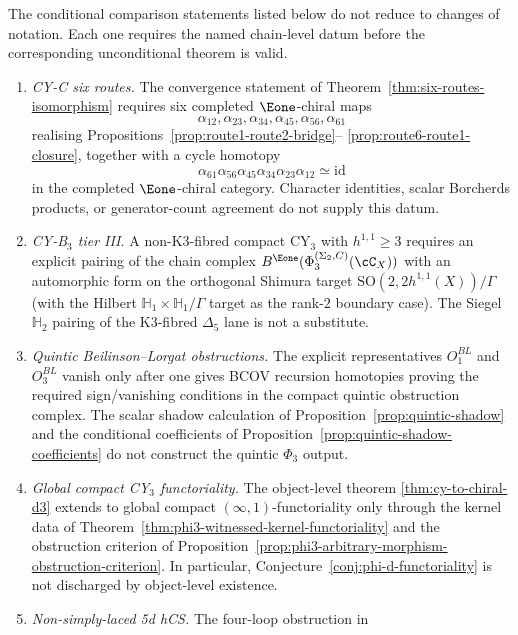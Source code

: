 \begin{theorem}
\label{thm:frontier-obstruction-normal-form}
The conditional comparison statements listed below do not reduce to
changes of notation. Each one requires the named chain-level datum
before the corresponding unconditional theorem is valid.
\begin{enumerate}[label=\textup{(F\arabic*)}]
 \item \emph{CY-C six routes.} The convergence statement of
 Theorem~\ref{thm:six-routes-isomorphism} requires six completed
 $\Eone$-chiral maps
 \[
 \alpha_{12},\alpha_{23},\alpha_{34},\alpha_{45},\alpha_{56},\alpha_{61}
 \]
 realising Propositions~\ref{prop:route1-route2-bridge}--
 \ref{prop:route6-route1-closure}, together with a cycle homotopy
 \[
 \alpha_{61}\alpha_{56}\alpha_{45}\alpha_{34}\alpha_{23}\alpha_{12}
 \simeq \mathrm{id}
 \]
 in the completed $\Eone$-chiral category. Character identities,
 scalar Borcherds products, or generator-count agreement do not supply
 this datum.
 \item \emph{CY-B$_3$ tier III.} A non-K3-fibred compact CY$_3$ with
 $h^{1,1}\geq 3$ requires an explicit pairing of the chain complex
 $B^{\Eone}(\Phi_3^{(\Sigma_2,C)}(\cC_X))$ with an automorphic form on
 the orthogonal Shimura target
 $\mathrm{SO}(2,2h^{1,1}(X))/\Gamma$ (with the Hilbert
 $\mathbb H_1\times\mathbb H_1/\Gamma$ target as the rank-$2$ boundary
 case). The Siegel $\mathbb H_2$ pairing of the K3-fibred
 $\Delta_5$ lane is not a substitute.
 \item \emph{Quintic Beilinson--Lorgat obstructions.} The explicit
 representatives $O_1^{BL}$ and $O_3^{BL}$ vanish only after one
 gives BCOV recursion homotopies proving the required sign/vanishing
 conditions in the compact quintic obstruction complex. The scalar
 shadow calculation of Proposition~\ref{prop:quintic-shadow} and the
 conditional coefficients of Proposition~\ref{prop:quintic-shadow-coefficients}
 do not construct the quintic $\Phi_3$ output.
 \item \emph{Global compact CY$_3$ functoriality.} The object-level
 theorem \ref{thm:cy-to-chiral-d3} extends to global compact
 $(\infty,1)$-functoriality only through the kernel data of
 Theorem~\ref{thm:phi3-witnessed-kernel-functoriality} and the
 obstruction criterion of Proposition~\ref{prop:phi3-arbitrary-morphism-obstruction-criterion}.
 In particular, Conjecture~\ref{conj:phi-d-functoriality} is not
 discharged by object-level existence.
 \item \emph{Non-simply-laced 5d hCS.} The four-loop obstruction in

\end{enumerate}
\end{theorem}
